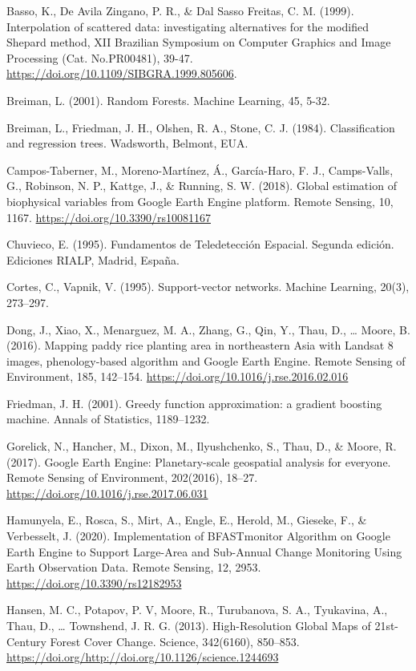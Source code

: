 \documentclass[
  12pt,
  letterpaper,
  twoside]{book}
\begin{document}
Basso, K., De Avila Zingano, P. R., \& Dal Sasso Freitas, C. M. (1999). Interpolation of scattered data: investigating alternatives for the modified Shepard method, XII Brazilian Symposium on Computer Graphics and Image Processing (Cat. No.PR00481), 39-47. \url{https://doi.org/10.1109/SIBGRA.1999.805606}.

Breiman, L. (2001). Random Forests. Machine Learning, 45, 5-32.

Breiman, L., Friedman, J. H., Olshen, R. A., Stone, C. J. (1984). Classification and regression trees. Wadsworth, Belmont, EUA.

Campos-Taberner, M., Moreno-Martínez, Á., García-Haro, F. J., Camps-Valls, G., Robinson, N. P., Kattge, J., \& Running, S. W. (2018). Global estimation of biophysical variables from Google Earth Engine platform. Remote Sensing, 10, 1167. \url{https://doi.org/10.3390/rs10081167}

Chuvieco, E. (1995). Fundamentos de Teledetección Espacial. Segunda edición. Ediciones RIALP, Madrid, España.

Cortes, C., Vapnik, V. (1995). Support-vector networks. Machine Learning, 20(3), 273--297.

Dong, J., Xiao, X., Menarguez, M. A., Zhang, G., Qin, Y., Thau, D., \ldots{} Moore, B. (2016). Mapping paddy rice planting area in northeastern Asia with Landsat 8 images, phenology-based algorithm and Google Earth Engine. Remote Sensing of Environment, 185, 142--154. \url{https://doi.org/10.1016/j.rse.2016.02.016}

Friedman, J. H. (2001). Greedy function approximation: a gradient boosting machine. Annals of Statistics, 1189--1232.

Gorelick, N., Hancher, M., Dixon, M., Ilyushchenko, S., Thau, D., \& Moore, R. (2017). Google Earth Engine: Planetary-scale geospatial analysis for everyone. Remote Sensing of Environment, 202(2016), 18--27. \url{https://doi.org/10.1016/j.rse.2017.06.031}

Hamunyela, E., Rosca, S., Mirt, A., Engle, E., Herold, M., Gieseke, F., \& Verbesselt, J. (2020). Implementation of BFASTmonitor Algorithm on Google Earth Engine to Support Large-Area and Sub-Annual Change Monitoring Using Earth Observation Data. Remote Sensing, 12, 2953. \url{https://doi.org/10.3390/rs12182953}

Hansen, M. C., Potapov, P. V, Moore, R., Turubanova, S. A., Tyukavina, A., Thau, D., \ldots{} Townshend, J. R. G. (2013). High-Resolution Global Maps of 21st-Century Forest Cover Change. Science, 342(6160), 850--853. \url{https://doi.org/http://doi.org/10.1126/science.1244693}
\end{document}

